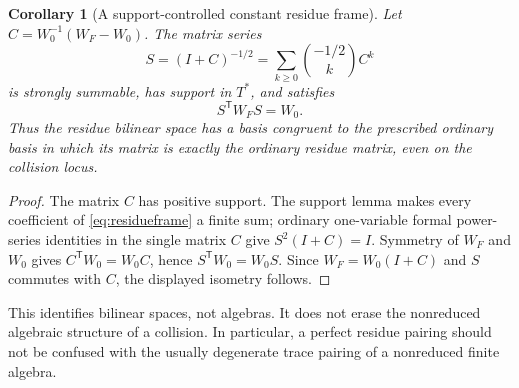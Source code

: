 \documentclass[11pt]{article}
\newtheorem{corollary}[theorem]{Corollary}
\theoremstyle{definition}
\begin{document}
\begin{corollary}[A support-controlled constant residue frame]\label{cor:residueframe}
Let $C=W_0^{-1}(W_F-W_0)$. The matrix series
\begin{equation}\label{eq:residueframe}
 S=(I+C)^{-1/2}
   =\sum_{k\ge0}\binom{-1/2}{k}C^k
\end{equation}
is strongly summable, has support in $T^*$, and satisfies
\[
 S^{\mathsf T}W_FS=W_0.
\]
Thus the residue bilinear space has a basis congruent to the prescribed ordinary basis in which its matrix is exactly the ordinary residue matrix, even on the collision locus.
\end{corollary}
\begin{proof}
The matrix $C$ has positive support. The support lemma makes every coefficient of \eqref{eq:residueframe} a finite sum; ordinary one-variable formal power-series identities in the single matrix $C$ give $S^2(I+C)=I$. Symmetry of $W_F$ and $W_0$ gives $C^{\mathsf T}W_0=W_0C$, hence $S^{\mathsf T}W_0=W_0S$. Since $W_F=W_0(I+C)$ and $S$ commutes with $C$, the displayed isometry follows.
\end{proof}
This identifies bilinear spaces, not algebras. It does not erase the nonreduced algebraic structure of a collision. In particular, a perfect residue pairing should not be confused with the usually degenerate trace pairing of a nonreduced finite algebra.
\end{document}
